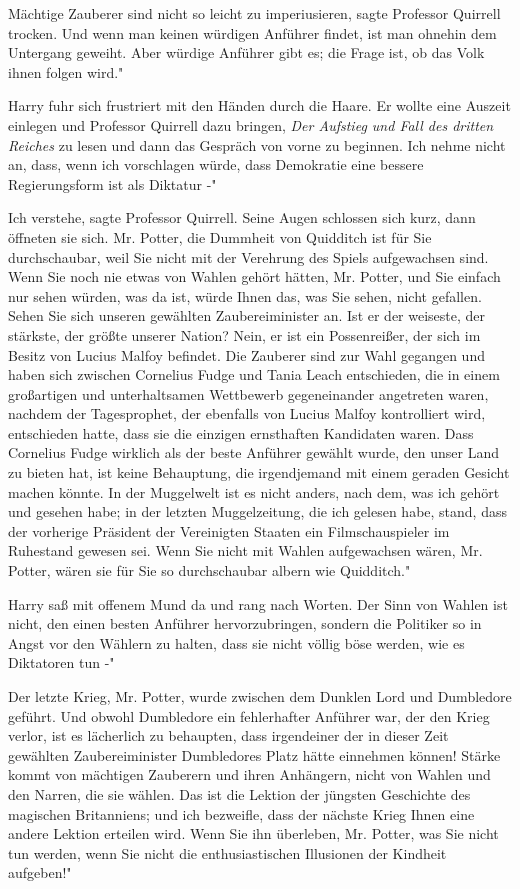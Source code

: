 \glqq Mächtige Zauberer sind nicht so leicht zu imperiusieren\grqq{}, sagte
Professor Quirrell trocken. \glqq Und wenn man keinen würdigen Anführer findet,
ist man ohnehin dem Untergang geweiht. Aber würdige Anführer gibt es; die Frage
ist, ob das Volk ihnen folgen wird."

Harry fuhr sich frustriert mit den Händen durch die Haare. Er wollte eine
Auszeit einlegen und Professor Quirrell dazu bringen, \emph{Der Aufstieg und
Fall des dritten Reiches }zu lesen und dann das Gespräch von vorne zu beginnen.
\glqq Ich nehme nicht an, dass, wenn ich vorschlagen würde, dass Demokratie eine
bessere Regierungsform ist als Diktatur -"

\glqq Ich verstehe\grqq{}, sagte Professor Quirrell. Seine Augen schlossen sich
kurz, dann öffneten sie sich. \glqq Mr. Potter, die Dummheit von Quidditch ist
für Sie durchschaubar, weil Sie nicht mit der Verehrung des Spiels aufgewachsen
sind. Wenn Sie noch nie etwas von Wahlen gehört hätten, Mr. Potter, und Sie
einfach nur sehen würden, was da ist, würde Ihnen das, was Sie sehen, nicht
gefallen. Sehen Sie sich unseren gewählten Zaubereiminister an. Ist er der
weiseste, der stärkste, der größte unserer Nation? Nein, er ist ein
Possenreißer, der sich im Besitz von Lucius Malfoy befindet. Die Zauberer sind
zur Wahl gegangen und haben sich zwischen Cornelius Fudge und Tania Leach
entschieden, die in einem großartigen und unterhaltsamen Wettbewerb
gegeneinander angetreten waren, nachdem der Tagesprophet, der ebenfalls von
Lucius Malfoy kontrolliert wird, entschieden hatte, dass sie die einzigen
ernsthaften Kandidaten waren. Dass Cornelius Fudge wirklich als der beste
Anführer gewählt wurde, den unser Land zu bieten hat, ist keine Behauptung, die
irgendjemand mit einem geraden Gesicht machen könnte. In der Muggelwelt ist es
nicht anders, nach dem, was ich gehört und gesehen habe; in der letzten
Muggelzeitung, die ich gelesen habe, stand, dass der vorherige Präsident der
Vereinigten Staaten ein Filmschauspieler im Ruhestand gewesen sei. Wenn Sie
nicht mit Wahlen aufgewachsen wären, Mr. Potter, wären sie für Sie so
durchschaubar albern wie Quidditch."

Harry saß mit offenem Mund da und rang nach Worten. \glqq Der Sinn von Wahlen
ist nicht, den einen besten Anführer hervorzubringen, sondern die Politiker so
in Angst vor den Wählern zu halten, dass sie nicht völlig böse werden, wie es
Diktatoren tun -"

\glqq Der letzte Krieg, Mr. Potter, wurde zwischen dem Dunklen Lord und
Dumbledore geführt. Und obwohl Dumbledore ein fehlerhafter Anführer war, der den
Krieg verlor, ist es lächerlich zu behaupten, dass irgendeiner der in dieser
Zeit gewählten Zaubereiminister Dumbledores Platz hätte einnehmen können! Stärke
kommt von mächtigen Zauberern und ihren Anhängern, nicht von Wahlen und den
Narren, die sie wählen. Das ist die Lektion der jüngsten Geschichte des
magischen Britanniens; und ich bezweifle, dass der nächste Krieg Ihnen eine
andere Lektion erteilen wird. Wenn Sie ihn überleben, Mr. Potter, was Sie nicht
tun werden, wenn Sie nicht die enthusiastischen Illusionen der Kindheit
aufgeben!"


